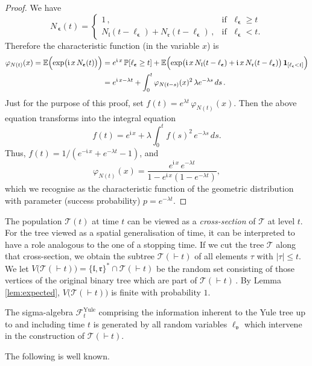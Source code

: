 \documentclass[12pt]{amsart}
\newcommand\A{\mathcal A}
\newcommand\bep{\boldsymbol{\epsilon}}
\newcommand\E{\mathbb E}
\newcommand\F{\mathcal F}
\newcommand\im{\mathfrak{i}\,}
\newcommand\lt{\mathfrak{l}}
\newcommand\nn{N}
\newcommand\Prob{\mathbb P}
\newcommand\rt{\mathfrak{r}}
\newcommand\T{\mathcal T}
\newcommand\vt{\mathfrak{v}}
\newcommand\uno{\mathbf 1}
\numberwithin{theorem}{section}
\theoremstyle{definition}
\begin{document}
\begin{proof}
We have 
$$
\nn_{\,\bep}(t) = \begin{cases}  1\,,&\text{if }\; \ell_{\bep} \ge t\\
                \nn_{\lt}(t-\ell_{\bep})+\nn_{\rt}(t-\ell_{\bep})\,,&\text{if }\;
                                 \ell_{\bep} < t.     
                  \end{cases}
$$
Therefore the characteristic function (in the variable $x$) is 
$$
\begin{aligned}
\varphi_{\nn(t)}(x) = \E\Bigl(\exp\bigl(\im x \,\nn_{\bep}(t)\bigr)\Bigr) 
&= e^{\im x}\,\Prob[\ell_{\bep} \ge t] 
+ \E\Bigl(\exp\bigl(\im x \,\nn_{\lt}(t-\ell_{\bep})+\im x \,\nn_{\rt}(t-\ell_{\bep})\bigr)\,
\uno_{[\ell_{\bep} < t]}\Bigr)
\\
&= e^{\im x -\lambda t} 
+ \int_0^t  \varphi_{\nn(t-s)}(x)^2\, \lambda e^{-\lambda s}\, ds\,.
\end{aligned}
$$
Just for the purpose of this proof, set 
$f(t) = e^{\lambda t}\, \varphi_{\nn(t)}(x)$.
Then the above equation transforms into the integral equation
$$
f(t) = e^{\im x} + \lambda \int_0^t f(s)^2 \,e^{-\lambda s} \, ds.
$$
Thus, $f(t) = 1/(e^{-\im x} + e^{-\lambda t} - 1)$, and 
$$
\varphi_{\nn(t)}(x) = \frac{e^{\im x} \,e^{-\lambda t}}{1 - e^{\im x}(1-e^{-\lambda t})},
$$
which we recognise as the characteristic function of the geometric distribution with
parameter (success probability) $p = e^{-\lambda t}$.
\end{proof}

The population $\T(t)$ at time $t$ can be viewed as a \emph{cross-section} of $\T$ at level $t$.
For the tree viewed as a spatial generalisation of time, it can be interpreted to have 
a role analogous to the one of a stopping time.
If we cut the tree $\T$ along that cross-section, we obtain the subtree $\T(\vdash\! t)$ 
of all elements $\tau$ with $|\tau| \le t$. We let 
$V\bigl(\T(\vdash\! t)\bigr) = \{\lt,\rt\}^* \cap \T(\vdash\! t)$ be the random set consisting of 
those vertices of the  original binary tree which are part of $\T(\vdash\! t)\,$. 
By Lemma \ref{lem:expected}, $V\bigl(\T(\vdash\! t)\bigr)$ is 
finite with probability $1$.

The sigma-algebra $\F_t^{\text{Yule}}$ comprising the information inherent to the 
Yule tree up to and including time $t$ 
is generated by all random variables $\ell_{\vt}$ 
which intervene in the construction of $\T(\vdash\! t)$. 

The following is well known.
\end{document}
